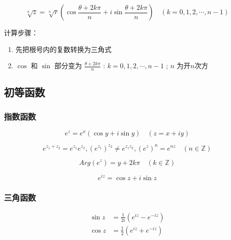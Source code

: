 \documentclass{article}
\begin{document}
\begin{equation}
    \sqrt[n]{z} = \sqrt[n]{r} (\cos \frac{\theta + 2k\pi}{n} + i \sin \frac{\theta + 2k\pi}{n}) \quad (k=0,1,2,\cdots,n-1)
\end{equation}

计算步骤：
\begin{enumerate}
    \item 先把根号内的复数转换为三角式
    \item $\cos$ 和 $\sin$ 部分变为 $\frac{\theta + 2k\pi}{n}$ : $k=0,1,2,\cdots,n-1$ ; $n$ 为开$n$次方
\end{enumerate}

\subsection{初等函数}

\subsubsection{指数函数}

\begin{equation}
    e^z = e^x (\cos y + i \sin y) \quad (z=x+iy)
\end{equation}

\begin{equation}
    e^{z_1+z_2} = e^{z_1} e^{z_2} , (e^{z_1})^{z_2} \neq e^{z_1 z_2} , (e^z)^n = e^{nz} \quad (n \in \mathbb{Z})
\end{equation}

\begin{equation}
    Arg(e^z) = y + 2k\pi \quad (k \in \mathbb{Z})
\end{equation}

\begin{equation}
    e^{iz}= \cos z + i \sin z
\end{equation}

\subsubsection{三角函数}

\begin{equation}
    \begin{aligned}
        \sin z &= \frac{1}{2i} (e^{iz} - e^{-iz}) \\
        \cos z &= \frac{1}{2} (e^{iz} + e^{-iz})
    \end{aligned}
\end{equation}
\end{document}
